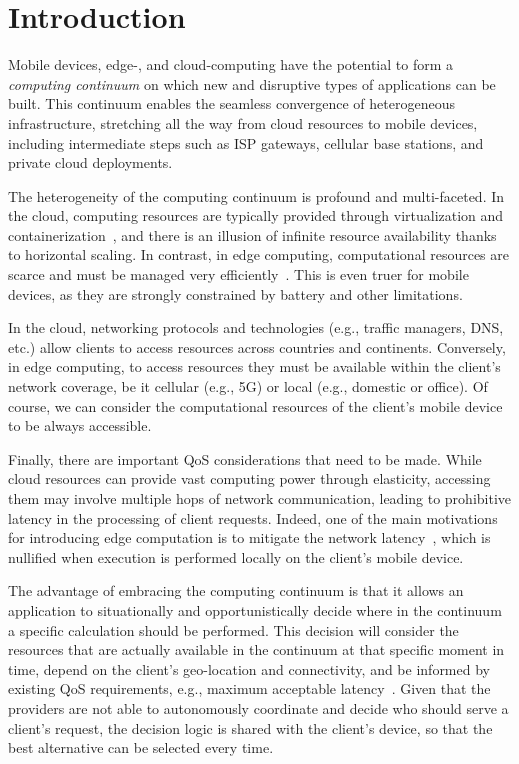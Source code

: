 \section{Introduction}
\label{sec:intro}

Mobile devices, edge-, and cloud-computing have the potential to form a \textit{computing continuum} on which new and disruptive types of applications can be built. This continuum enables the seamless convergence of heterogeneous infrastructure, stretching all the way from cloud resources to mobile devices, including intermediate steps such as ISP gateways, cellular base stations, and private cloud deployments.

The heterogeneity of the computing continuum is profound and multi-faceted. In the cloud, computing resources are typically provided through virtualization and containerization~\cite{leitner2016patterns, Quatrocchi2016discrete}, and there is an illusion of infinite resource availability thanks to horizontal scaling. In contrast, in edge computing, computational resources are scarce and must be managed very efficiently~\cite{Dehos14millimeter5g,GarrigaMendonca2017}. This is even truer for mobile devices, as they are strongly constrained by battery and other limitations. 

In the cloud, networking protocols and technologies (e.g., traffic managers, DNS, etc.) allow clients to access resources across countries and continents. Conversely, in edge computing, to access resources they must be available within the client's network coverage, be it cellular (e.g., 5G) or local (e.g., domestic or office). Of course, we can consider the computational resources of the client's mobile device to be always accessible. %

Finally, there are important QoS considerations that need to be made. While cloud resources can provide vast computing power through elasticity, accessing them may involve multiple hops of network communication, leading to prohibitive latency in the processing of client requests. Indeed, one of the main motivations for introducing edge computation is to mitigate the network latency~\cite{Shi:2016}, which is nullified when execution is performed locally on the client's mobile device.

The advantage of embracing the computing continuum is that it allows an application to situationally and opportunistically decide where in the continuum a specific calculation should be performed. This decision will consider the resources that are actually available in the continuum at that specific moment in time, depend on the client's geo-location and connectivity, and be informed by existing QoS requirements, e.g., maximum acceptable latency~\cite{GuptaIfogSim17}. Given that the providers are not able to autonomously coordinate and decide who should serve a client's request, the decision logic is shared with the client's device, so that the best alternative can be selected every time.

